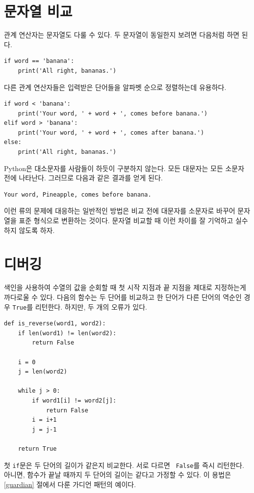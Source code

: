 \documentclass[10pt]{book}
\begin{document}
\section{문자열 비교}

관계 연산자는 문자열도 다룰 수 있다.  두 문자열이 동일한지 보려면 다음처럼 하면 된다. 

\begin{verbatim}
if word == 'banana':
    print('All right, bananas.')
\end{verbatim}
%
다른 관계 연산자들은 입력받은 단어들을 알파벳 순으로 정렬하는데 유용하다.

\begin{verbatim}
if word < 'banana':
    print('Your word, ' + word + ', comes before banana.')
elif word > 'banana':
    print('Your word, ' + word + ', comes after banana.')
else:
    print('All right, bananas.')
\end{verbatim}
%
Python은 대소문자를 사람들이 하듯이 구분하지 않는다.  모든 대문자는
모든 소문자 전에 나타난다.  그러므로 다음과 같은 결과를 얻게 된다.

\begin{verbatim}
Your word, Pineapple, comes before banana.
\end{verbatim}
%
이런 류의 문제에 대응하는 일반적인 방법은 비교 전에 대문자를 소문자로
바꾸어 문자열을 표준 형식으로 변환하는 것이다.  문자열 비교할 때 이런
차이를 잘 기억하고 실수하지 않도록 하자.



\section{디버깅}

색인을 사용하여 수열의 값을 순회할 때 첫 시작 지점과 끝 지점을 제대로
지정하는게 까다로울 수 있다.  다음의 함수는 두 단어를 비교하고 한
단어가 다른 단어의 역순인 경우 {\tt True}를 리턴한다.  하지만, 두 개의
오류가 있다.


\begin{verbatim}
def is_reverse(word1, word2):
    if len(word1) != len(word2):
        return False
    
    i = 0
    j = len(word2)

    while j > 0:
        if word1[i] != word2[j]:
            return False
        i = i+1
        j = j-1

    return True
\end{verbatim}
%
첫 {\tt if}문은 두 단어의 길이가 같은지 비교한다.  서로 다르면 {\tt
  False}를 즉시 리턴한다.  아니면, 함수가 끝날 때까지 두 단어의 길이는
같다고 가정할 수 있다.  이 용법은 \ref{guardian} 절에서 다룬 가디언
패턴의 예이다.
\end{document}
